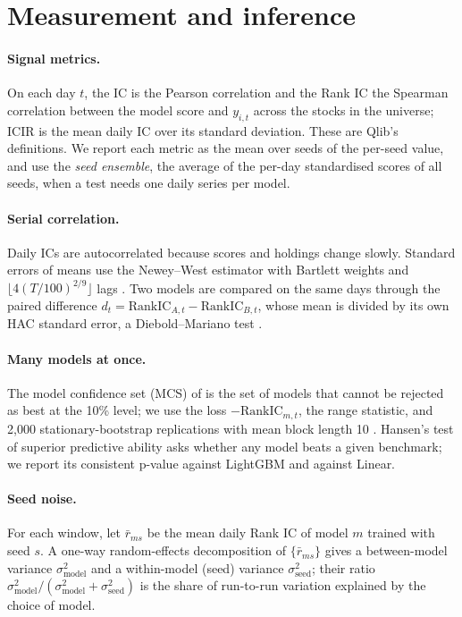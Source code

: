 \documentclass[11pt]{article}
\begin{document}
\section{Measurement and inference}\label{sec:inference}

\paragraph{Signal metrics.}
On each day $t$, the IC is the Pearson correlation and the Rank IC the Spearman correlation between the model score and $y_{i,t}$ across the stocks in the universe; ICIR is the mean daily IC over its standard deviation.
These are Qlib's definitions.
We report each metric as the mean over seeds of the per-seed value, and use the \emph{seed ensemble}, the average of the per-day standardised scores of all seeds, when a test needs one daily series per model.

\paragraph{Serial correlation.}
Daily ICs are autocorrelated because scores and holdings change slowly.
Standard errors of means use the Newey--West estimator with Bartlett weights and $\lfloor 4(T/100)^{2/9}\rfloor$ lags \citep{newey1987simple,newey1994automatic}.
Two models are compared on the same days through the paired difference $d_t=\mathrm{RankIC}_{A,t}-\mathrm{RankIC}_{B,t}$, whose mean is divided by its own HAC standard error, a Diebold--Mariano test \citep{diebold1995comparing}.

\paragraph{Many models at once.}
The model confidence set (MCS) of \citet{hansen2011mcs} is the set of models that cannot be rejected as best at the 10\% level; we use the loss $-\mathrm{RankIC}_{m,t}$, the range statistic, and 2{,}000 stationary-bootstrap replications with mean block length 10 \citep{politis1994stationary}.
Hansen's test of superior predictive ability \citep[SPA,][]{hansen2005spa} asks whether any model beats a given benchmark; we report its consistent p-value against LightGBM and against Linear.

\paragraph{Seed noise.}
For each window, let $\bar r_{ms}$ be the mean daily Rank IC of model $m$ trained with seed $s$.
A one-way random-effects decomposition of $\{\bar r_{ms}\}$ gives a between-model variance $\sigma^2_{\text{model}}$ and a within-model (seed) variance $\sigma^2_{\text{seed}}$; their ratio $\sigma^2_{\text{model}}/(\sigma^2_{\text{model}}+\sigma^2_{\text{seed}})$ is the share of run-to-run variation explained by the choice of model.
\end{document}
